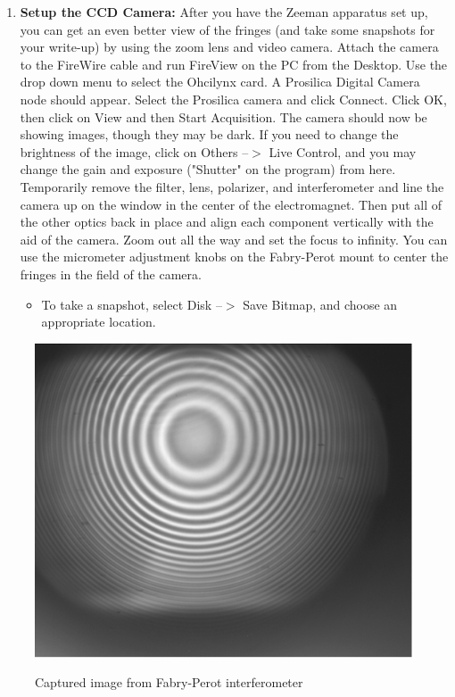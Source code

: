 \documentclass{../lab}
\begin{document}
\begin{enumerate}
\begin{itemize}
\begin{itemize}
\begin{enumerate}
                \item \textbf{Setup the CCD Camera:} After you have the Zeeman apparatus set up, you can get an even better view of the fringes (and take some snapshots for your write-up) by using the zoom lens and video camera. Attach the camera to the FireWire cable and run FireView on the PC from the Desktop. Use the drop down menu to select the Ohcilynx card. A Prosilica Digital Camera node should appear. Select the Prosilica camera and click Connect. Click OK, then click on View and then Start Acquisition. The camera should now be showing images, though they may be dark. If you need to change the brightness of the image, click on Others --$>$ Live Control, and you may change the gain and exposure ("Shutter" on the program) from here. Temporarily remove the filter, lens, polarizer, and interferometer and line the camera up on the window in the center of the electromagnet. Then put all of the other optics back in place and align each component vertically with the aid of the camera. Zoom out all the way and set the focus to infinity. You can use the micrometer adjustment knobs on the Fabry-Perot mount to center the fringes in the field of the camera.
            
                \begin{itemize}
                    \item To take a snapshot, select Disk --$>$ Save Bitmap, and choose an appropriate location.
                \end{itemize}
            
            \end{enumerate}

        \end{itemize}
        
    \end{itemize}
    
    \begin{figure}[H]
    \centering
        \href{http://experimentationlab.berkeley.edu/sites/default/files/images/Atmimage031.gif}{\includegraphics[width=0.6\linewidth]{images/Atmimage031.png}} \\
        \caption{Captured image from Fabry-Perot interferometer}
        \label{CapturedImage}
    \end{figure}
    

\end{enumerate}
\end{document}
